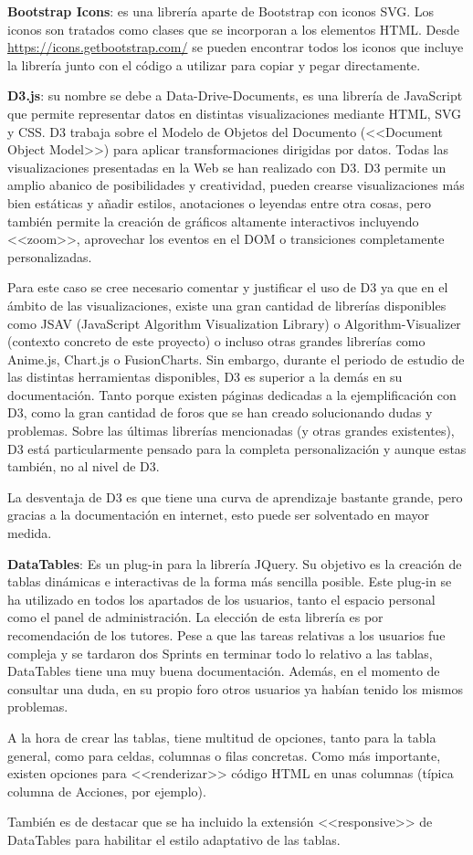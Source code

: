 \textbf{Bootstrap Icons}: es una librería aparte de Bootstrap con iconos SVG.
Los iconos son tratados como clases que se incorporan a los elementos HTML.
Desde \url{https://icons.getbootstrap.com/} se pueden encontrar todos los iconos
que incluye la librería junto con el código a utilizar para copiar y pegar
directamente.

\textbf{D3.js}: su nombre se debe a Data-Drive-Documents, es una librería de
JavaScript que permite representar datos en distintas visualizaciones mediante
HTML, SVG y CSS. D3 trabaja sobre el Modelo de Objetos del Documento (<<Document
Object Model>>) para aplicar transformaciones dirigidas por datos. Todas las
visualizaciones presentadas en la Web se han realizado con D3. D3 permite un
amplio abanico de posibilidades y creatividad, pueden crearse visualizaciones
más bien estáticas y añadir estilos, anotaciones o leyendas entre otra cosas,
pero también permite la creación de gráficos altamente interactivos incluyendo
<<zoom>>, aprovechar los eventos en el DOM o transiciones completamente
personalizadas.

Para este caso se cree necesario comentar y justificar el uso de D3 ya que en el
ámbito de las visualizaciones, existe una gran cantidad de librerías disponibles
como JSAV (JavaScript Algorithm Visualization Library) o Algorithm-Visualizer
(contexto concreto de este proyecto) o incluso otras grandes librerías como
Anime.js, Chart.js o FusionCharts. Sin embargo, durante el periodo de estudio de
las distintas herramientas disponibles, D3 es superior a la demás en su
documentación. Tanto porque existen páginas dedicadas a la ejemplificación con
D3, como la gran cantidad de foros que se han creado solucionando dudas y
problemas. Sobre las últimas librerías mencionadas (y otras grandes existentes),
D3 está particularmente pensado para la completa personalización y aunque estas
también, no al nivel de D3.

La desventaja de D3 es que tiene una curva de aprendizaje bastante grande, pero
gracias a la documentación en internet, esto puede ser solventado en mayor
medida.

\textbf{DataTables}: Es un plug-in para la librería JQuery. Su objetivo es la
creación de tablas dinámicas e interactivas de la forma más sencilla posible.
Este plug-in se ha utilizado en todos los apartados de los usuarios, tanto el
espacio personal como el panel de administración. La elección de esta librería
es por recomendación de los tutores. Pese a que las tareas relativas a los
usuarios fue compleja y se tardaron dos Sprints en terminar todo lo relativo a
las tablas, DataTables tiene una muy buena documentación. Además, en el momento
de consultar una duda, en su propio foro otros usuarios ya habían tenido los
mismos problemas.

A la hora de crear las tablas, tiene multitud de opciones, tanto para la tabla
general, como para celdas, columnas o filas concretas. Como más importante,
existen opciones para <<renderizar>> código HTML en unas columnas (típica
columna de Acciones, por ejemplo).

También es de destacar que se ha incluido la extensión <<responsive>> de
DataTables para habilitar el estilo adaptativo de las tablas.